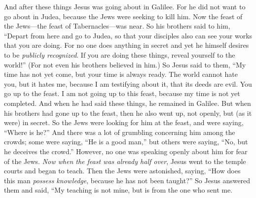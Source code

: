 \begin{biblechapter} %
 And after these things Jesus was going about in Galilee. For he did not want to go about in Judea, because the Jews were seeking to kill him.
\verse Now the feast of the Jews—the feast of Tabernacles—was near.
\verse So his brothers said to him, “Depart from here and go to Judea, so that your disciples also can see your works that you are doing.
\verse For no one does anything in secret and yet he himself desires to be \textit{publicly recognized}. If you are doing these things, reveal yourself to the world!”
\verse (For not even his brothers believed in him.)
 So Jesus said to them, “My time has not yet come, but your time is always ready.
\verse The world cannot hate you, but it hates me, because I am testifying about it, that its deeds are evil.
\verse You go up to the feast. I am not going up to this feast, because my time is not yet completed.
\verse And when he had said these things, he remained in Galilee.
\verse But when his brothers had gone up to the feast, then he also went up, not openly, but (as it were) in secret.
\verse So the Jews were looking for him at the feast, and were saying, “Where is he?”
\verse And there was a lot of grumbling concerning him among the crowds; some were saying, “He is a good man,” but others were saying, “No, but he deceives the crowd.”
\verse However, no one was speaking openly about him for fear of the Jews.
\verse \textit{Now when the feast was already half over}, Jesus went to the temple courts and began to teach.
\verse Then the Jews were astonished, saying, “How does this man \textit{possess knowledge}, because he has not been taught?”
\verse So Jesus answered them and said, “My teaching is not mine, but is from the one who sent me.

\end{biblechapter}
